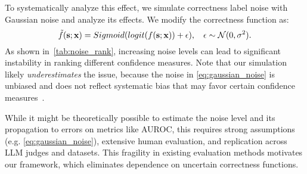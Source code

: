 To systematically analyze this effect, we simulate correctness label noise with Gaussian noise and analyze its effects.
We modify the correctness function as:
\begin{equation}
\small
    \tilde{f}(\mathbf{s}; \mathbf{x}) = Sigmoid(logit(f(\mathbf{s}; \mathbf{x})) + \epsilon), \quad \epsilon \sim \mathcal{N}(0, \sigma^2).\label{eq:gaussian_noise}
\end{equation}
As shown in~\cref{tab:noise_rank}, increasing noise levels can lead to significant instability in ranking different confidence measures.
Note that our simulation likely \textit{underestimates} the issue, because the noise in \cref{eq:gaussian_noise} is unbiased and does not reflect systematic bias that may favor certain confidence measures~\cite{lin2022truthfulqa}. 




\begin{table}[t]
\centering
\small
{}
\vspace{-2mm}
\caption{Ranking of uncertainty quantification methods before and after noise.}
\label{tab:noise_rank}
\end{table}

While it might be theoretically possible to estimate the noise level and its propagation to errors on metrics like AUROC, this requires strong assumptions (e.g. \cref{eq:gaussian_noise}), extensive human evaluation, and replication across LLM judges and datasets. 
This fragility in existing evaluation methods motivates our framework, which eliminates dependence on uncertain correctness functions.




